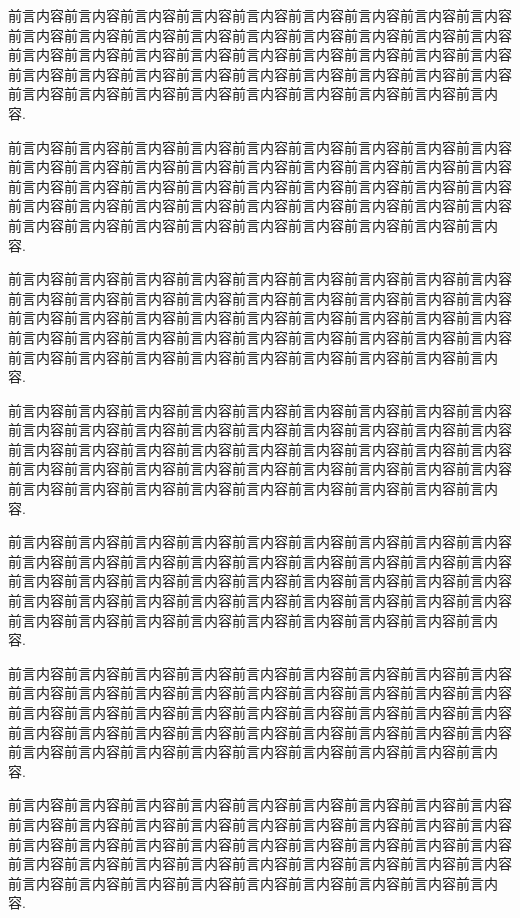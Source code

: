 

\begin{preface}

前言内容前言内容前言内容前言内容前言内容前言内容前言内容前言内容前言内容前言内容前言内容前言内容前言内容前言内容前言内容前言内容前言内容前言内容前言内容前言内容前言内容前言内容前言内容前言内容前言内容前言内容前言内容前言内容前言内容前言内容前言内容前言内容前言内容前言内容前言内容前言内容前言内容前言内容前言内容前言内容前言内容前言内容前言内容前言内容前言内容.

前言内容前言内容前言内容前言内容前言内容前言内容前言内容前言内容前言内容前言内容前言内容前言内容前言内容前言内容前言内容前言内容前言内容前言内容前言内容前言内容前言内容前言内容前言内容前言内容前言内容前言内容前言内容前言内容前言内容前言内容前言内容前言内容前言内容前言内容前言内容前言内容前言内容前言内容前言内容前言内容前言内容前言内容前言内容前言内容前言内容.

前言内容前言内容前言内容前言内容前言内容前言内容前言内容前言内容前言内容前言内容前言内容前言内容前言内容前言内容前言内容前言内容前言内容前言内容前言内容前言内容前言内容前言内容前言内容前言内容前言内容前言内容前言内容前言内容前言内容前言内容前言内容前言内容前言内容前言内容前言内容前言内容前言内容前言内容前言内容前言内容前言内容前言内容前言内容前言内容前言内容.

前言内容前言内容前言内容前言内容前言内容前言内容前言内容前言内容前言内容前言内容前言内容前言内容前言内容前言内容前言内容前言内容前言内容前言内容前言内容前言内容前言内容前言内容前言内容前言内容前言内容前言内容前言内容前言内容前言内容前言内容前言内容前言内容前言内容前言内容前言内容前言内容前言内容前言内容前言内容前言内容前言内容前言内容前言内容前言内容前言内容.

前言内容前言内容前言内容前言内容前言内容前言内容前言内容前言内容前言内容前言内容前言内容前言内容前言内容前言内容前言内容前言内容前言内容前言内容前言内容前言内容前言内容前言内容前言内容前言内容前言内容前言内容前言内容前言内容前言内容前言内容前言内容前言内容前言内容前言内容前言内容前言内容前言内容前言内容前言内容前言内容前言内容前言内容前言内容前言内容前言内容.

前言内容前言内容前言内容前言内容前言内容前言内容前言内容前言内容前言内容前言内容前言内容前言内容前言内容前言内容前言内容前言内容前言内容前言内容前言内容前言内容前言内容前言内容前言内容前言内容前言内容前言内容前言内容前言内容前言内容前言内容前言内容前言内容前言内容前言内容前言内容前言内容前言内容前言内容前言内容前言内容前言内容前言内容前言内容前言内容前言内容.

前言内容前言内容前言内容前言内容前言内容前言内容前言内容前言内容前言内容前言内容前言内容前言内容前言内容前言内容前言内容前言内容前言内容前言内容前言内容前言内容前言内容前言内容前言内容前言内容前言内容前言内容前言内容前言内容前言内容前言内容前言内容前言内容前言内容前言内容前言内容前言内容前言内容前言内容前言内容前言内容前言内容前言内容前言内容前言内容前言内容.


\end{preface}

